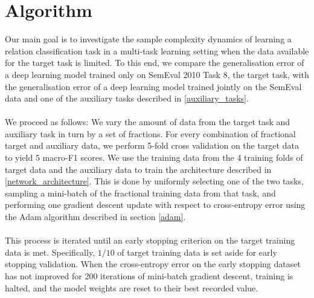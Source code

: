 \section{Algorithm}

Our main goal is to investigate the sample complexity dynamics of learning a relation classification task in a multi-task learning setting when the data available for the target task is limited. To this end, we compare the generalisation error of a deep learning model trained only on SemEval 2010 Task 8, the target task, with the generalisation error of a deep learning model trained jointly on the SemEval data and one of the auxiliary tasks described in \ref{auxiliary_tasks}.
\\\\
We proceed as follows: We vary the amount of data from the target task and auxiliary task in turn by a set of fractions. For every combination of fractional target and auxiliary data, we perform 5-fold cross validation on the target data to yield 5 macro-F1 scores. We use the training data from the 4 training folds of target data and the auxiliary data to train the architecture described in \ref{network_architecture}. This is done by uniformly selecting one of the two tasks, sampling a mini-batch of the fractional training data from that task, and performing one gradient descent update with respect to cross-entropy error using the Adam algorithm described in section \ref{adam}. 
\\\\
This process is iterated until an early stopping criterion on the target training data is met. Specifically, $1/10$ of target training data is set aside for early stopping validation. When the cross-entropy error on the early stopping dataset has not improved for 200 iterations of mini-batch gradient descent, training is halted, and the model weights are reset to their best recorded value.

